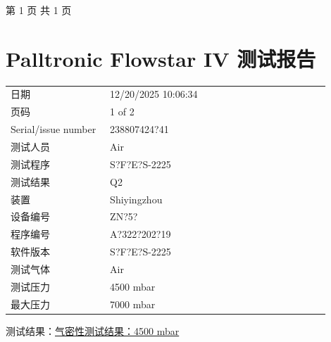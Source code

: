 \documentclass[UTF8,10pt,a4paper,fontset=fandol]{ctexart}
\newcommand{\fieldvalue}[1]{#1}
\begin{document}
\normalsize
\begin{center}
第 1 页 共 1 页
\end{center}

\newpage

\section*{Palltronic Flowstar IV 测试报告}

\begin{tabular}{@{}p{0.28\linewidth}p{0.62\linewidth}@{}}
日期 &
\fieldvalue{12/20/2025 10:06:34}
\\
页码 &
\fieldvalue{1 of 2}
\\
Serial/issue number &
\fieldvalue{238807424?41}
\\
测试人员 &
\fieldvalue{Air}
\\
测试程序 &
\fieldvalue{S?F?E?S-2225}
\\
测试结果 &
\fieldvalue{Q2}
\\
装置 &
\fieldvalue{Shiyingzhou}
\\
设备编号 &
\fieldvalue{ZN?5?}
\\
程序编号 &
\fieldvalue{A?322?202?19}
\\
软件版本 &
\fieldvalue{S?F?E?S-2225}
\\
测试气体 &
\fieldvalue{Air}
\\
测试压力 &
\fieldvalue{4500 mbar}
\\
最大压力 &
\fieldvalue{7000 mbar}
\end{tabular}

\vspace{1em}

测试结果：\underline{气密性测试结果：4500 mbar}

\vspace{1em}
\end{document}
